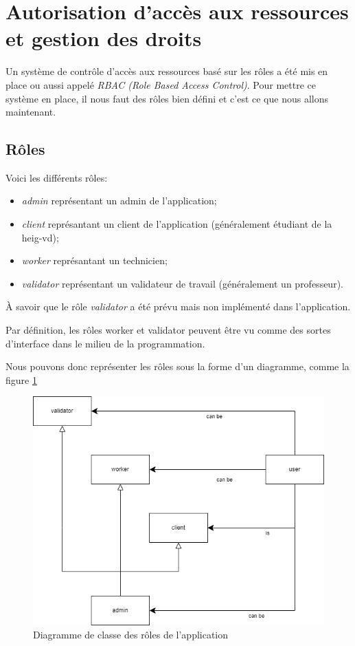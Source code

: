 \documentclass[
    iai, %
    il, %
]{heig-tb}
\begin{document}
\section{Autorisation d'accès aux ressources et gestion des droits}

Un système de contrôle d'accès aux ressources basé sur les rôles a été mis en place ou aussi appelé \emph{RBAC (Role Based Access Control)}.
Pour mettre ce système en place, il nous faut des rôles bien défini et c'est ce que nous allons maintenant.

\subsection{Rôles}
Voici les différents rôles:
\begin{itemize}
    \item \emph{admin} représentant un admin de l'application;
    \item \emph{client} représantant un client de l'application (généralement étudiant de la \Gls{heig-vd});
    \item \emph{worker} représantant un technicien;
    \item \emph{validator} représentant un validateur de travail (généralement un professeur).
\end{itemize}

À savoir que le rôle \emph{validator} a été prévu mais non implémenté dans l'application.

Par définition, les rôles worker et validator peuvent être vu comme des sortes d'interface dans le milieu de la programmation.

Nous pouvons donc représenter les rôles sous la forme d'un diagramme, comme la figure \ref{roles-diagram.drawio}

\begin{center}
    \begin{figure}
        \includegraphics[width=\textwidth]{./assets/figures/roles-diagram.drawio.png}
        \caption{Diagramme de classe des rôles de l'application \label{roles-diagram.drawio}}
    \end{figure}
\end{center}
\end{document}
